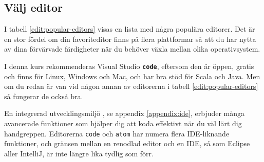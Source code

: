 \subsection{Välj editor}\label{appendix:compile:edit}

I tabell \ref{edit:popular-editors} visas en lista med några populära editorer. Det är en stor fördel om din favoriteditor finns på flera plattformar så att du har nytta av dina förvärvade färdigheter när du behöver växla mellan olika operativsystem.

I denna kurs rekommenderas Visual Studio \textbf{\texttt{code}}, eftersom den är öppen, gratis och finns för Linux, Windows och Mac, och har bra stöd för Scala och Java. Men om du redan är van vid någon annan av editorerna i tabell \ref{edit:popular-editors} så fungerar de också bra. 

En integrerad utvecklingsmiljö , se appendix \ref{appendix:ide}, erbjuder många avancerade funktioner som hjälper dig att koda effektivt när du väl lärt dig handgreppen. Editorerna \texttt{code} och \texttt{atom} har numera flera IDE-liknande funktioner, och gränsen mellan en renodlad editor och en IDE, så som Eclipse aller IntelliJ, är inte längre lika tydlig som förr.  %




